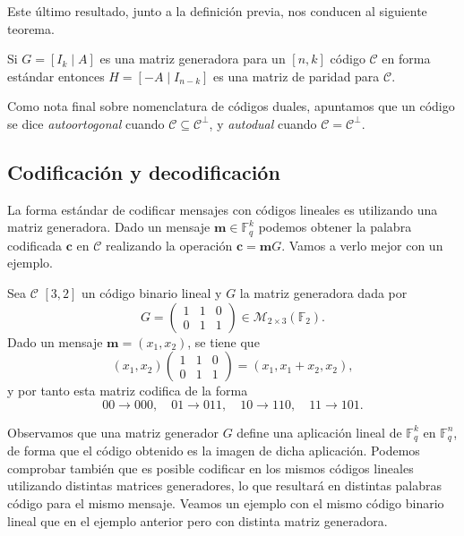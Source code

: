 Este último resultado, junto a la definición previa, nos conducen al siguiente teorema. 

\begin{theorem}
  Si \(G = [I_k \mid A]\) es una matriz generadora para un \([n, k]\) código \(\mathcal C\) en forma estándar entonces \(H = [-A \mid I_{n-k}]\) es una matriz de paridad para \(\mathcal C\).
\end{theorem}

Como nota final sobre nomenclatura de códigos duales, apuntamos que un código se dice \textit{autoortogonal} cuando \(\mathcal C \subseteq \mathcal C^{\perp}\), y \textit{autodual} cuando \(\mathcal C = \mathcal C^{\perp}\).

\subsection{Codificación y decodificación}

La forma estándar de codificar mensajes con códigos lineales es utilizando una matriz generadora.
Dado un mensaje \(\mathbf{m} \in \mathbb F_q^k\) podemos obtener la palabra codificada \(\mathbf{c}\) en \(\mathcal C\) realizando la operación \(\mathbf{c}= \mathbf{m}G\).
Vamos a verlo mejor con un ejemplo.

\begin{example}
  Sea \(\mathcal C\) \([3, 2]\) un código binario lineal y \(G\) la matriz generadora dada por 
  \[
    G = \begin{pmatrix}
      1 & 1 & 0 \\ 0 & 1 & 1
    \end{pmatrix} \in \mathcal M_{2 \times 3}(\mathbb F_2).
  \]
  Dado un mensaje \(\mathbf{m} = (x_1, x_2)\), se tiene que \[(x_1, x_2) \begin{pmatrix}
    1 & 1 & 0 \\ 0 & 1 & 1
  \end{pmatrix} = (x_1, x_1 + x_2, x_2),\] y por tanto esta matriz codifica de la forma \[00 \to 000, \quad 01 \to 011,\quad 10 \to 110,\quad 11 \to 101.\]
\end{example}

Observamos que una matriz generador \(G\) define una aplicación lineal de \(\mathbb F_q^k\) en \(\mathbb F_q^n\), de forma que el código obtenido es la imagen de dicha aplicación.
Podemos comprobar también que es posible codificar en los mismos códigos lineales utilizando distintas matrices generadores, lo que resultará en distintas palabras código para el mismo mensaje.
Veamos un ejemplo con el mismo código binario lineal que en el ejemplo anterior pero con distinta matriz generadora.

